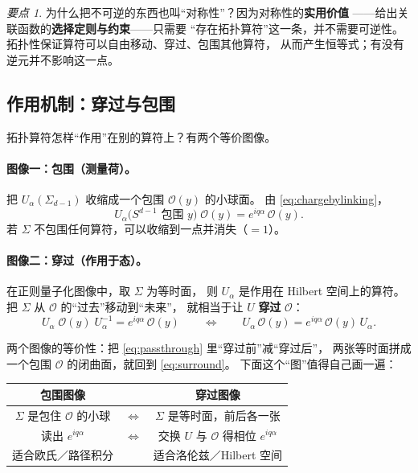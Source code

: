\documentclass[UTF8,a4paper,11pt]{ctexart}
\theoremstyle{plain}
\theoremstyle{definition}
\theoremstyle{remark}
\newtheorem{keypoint}{要点}[section]
\newcommand{\Op}{\mathcal{O}}
\newcommand{\Ssurf}{\Sigma}
\newcommand{\Uop}{U}
\begin{document}
\begin{keypoint}
\label{kp:whysymmetry}
为什么把不可逆的东西也叫“对称性”？因为对称性的\textbf{实用价值}
——给出关联函数的\textbf{选择定则与约束}——只需要
“存在拓扑算符”这一条，并不需要可逆性。
拓扑性保证算符可以自由移动、穿过、包围其他算符，
从而产生恒等式；有没有逆元并不影响这一点。
\end{keypoint}

\subsection{作用机制：穿过与包围}
\label{subsec:action}

拓扑算符怎样“作用”在别的算符上？有两个等价图像。

\paragraph{图像一：包围（测量荷）。}
把 $\Uop_\alpha(\Ssurf_{d-1})$ 收缩成一个包围 $\Op(y)$ 的小球面。
由 \eqref{eq:chargebylinking}，
\begin{equation}
  \Uop_\alpha\big(S^{d-1}\text{ 包围 }y\big)\;\Op(y)
  = e^{iq\alpha}\,\Op(y) .
  \label{eq:surround}
\end{equation}
若 $\Ssurf$ 不包围任何算符，可以收缩到一点并消失（$=1$）。

\paragraph{图像二：穿过（作用于态）。}
在正则量子化图像中，取 $\Ssurf$ 为等时面，
则 $\Uop_\alpha$ 是作用在 Hilbert 空间上的算符。
把 $\Ssurf$ 从 $\Op$ 的“过去”移动到“未来”，
就相当于让 $\Uop$ \textbf{穿过} $\Op$：
\begin{equation}
  \Uop_\alpha\;\Op(y)\;\Uop_\alpha^{-1}=e^{iq\alpha}\,\Op(y)
  \qquad\Longleftrightarrow\qquad
  \Uop_\alpha\,\Op(y)=e^{iq\alpha}\,\Op(y)\,\Uop_\alpha .
  \label{eq:passthrough}
\end{equation}

两个图像的等价性：把 \eqref{eq:passthrough} 里“穿过前”减“穿过后”，
两张等时面拼成一个包围 $\Op$ 的闭曲面，就回到 \eqref{eq:surround}。
下面这个“图”值得自己画一遍：

\begin{center}
\begin{tabular}{@{}ccc@{}}
\toprule
包围图像 & & 穿过图像 \\
\midrule
$\Ssurf$ 是包住 $\Op$ 的小球
 & $\Longleftrightarrow$
 & $\Ssurf$ 是等时面，前后各一张 \\
读出 $e^{iq\alpha}$
 & $\Longleftrightarrow$
 & 交换 $\Uop$ 与 $\Op$ 得相位 $e^{iq\alpha}$ \\
适合欧氏／路径积分
 & &
适合洛伦兹／Hilbert 空间 \\
\bottomrule
\end{tabular}
\end{center}
\end{document}

